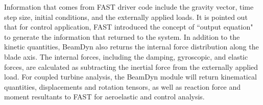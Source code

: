 Information that comes from FAST driver code include the gravity vector, time step size, initial conditions, and the externally applied loads. It is pointed out that for control application, FAST introduced the concept of ``output equation" to generate the information that returned to the system. In addition to the kinetic quantities, BeamDyn also returns the internal force distribution along the blade axis. The internal forces, including the damping, gyroscopic, and elastic forces, are calculated as subtracting the inertial force from the externally applied load. For coupled turbine analysis, the BeamDyn module will return kinematical quantities, displacements and rotation tensors, as well as reaction force and moment resultants to FAST for aeroelastic and control analysis.



